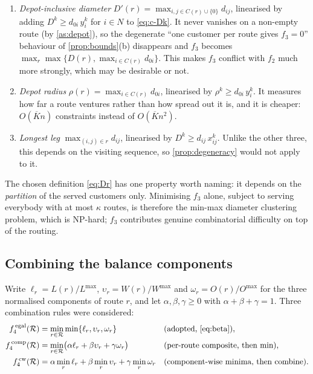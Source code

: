 \documentclass[11pt,a4paper]{article}
\theoremstyle{definition}
\theoremstyle{plain}
\newcommand{\Routes}{\mathcal{R}}
\newcommand{\Cust}{N}
\newcommand{\Lmax}{L^{\max}}
\newcommand{\Wmax}{W^{\max}}
\newcommand{\Omax}{O^{\max}}
\begin{document}
\begin{enumerate}[label=(\alph*),leftmargin=*]
\item \emph{Depot-inclusive diameter}
  $D'(r) = \max_{i,j \in C(r)\cup\{0\}} d_{ij}$, linearised by adding
  $D^k \ge d_{0i}\, y^k_i$ for $i \in \Cust$ to \eqref{eq:c-Dk}.  It never
  vanishes on a non-empty route (by \cref{as:depot}), so the degenerate
  ``one customer per route gives $f_3 = 0$'' behaviour of
  \cref{prop:bounds}(b) disappears and $f_3$ becomes
  $\max_r \max\{D(r), \max_{i\in C(r)} d_{0i}\}$.  This makes $f_3$ conflict
  with $f_2$ much more strongly, which may be desirable or not.
\item \emph{Depot radius} $\rho(r) = \max_{i \in C(r)} d_{0i}$, linearised by
  $\rho^k \ge d_{0i}\,y^k_i$.  It measures how far a route ventures rather than
  how spread out it is, and it is cheaper: $O(\overline{K} n)$ constraints
  instead of $O(\overline{K} n^2)$.
\item \emph{Longest leg} $\max_{(i,j) \in r} d_{ij}$, linearised by
  $D^k \ge d_{ij}\, x^k_{ij}$.  Unlike the other three, this depends on the
  visiting sequence, so \cref{prop:degeneracy} would not apply to it.
\end{enumerate}

The chosen definition \eqref{eq:Dr} has one property worth naming: it depends
on the \emph{partition} of the served customers only.  Minimising $f_3$ alone,
subject to serving everybody with at most $\kappa$ routes, is therefore the
min-max diameter clustering problem, which is NP-hard; $f_3$ contributes
genuine combinatorial difficulty on top of the routing.

\subsection{Combining the balance components}
\label{sec:alt-balance}

Write $\ell_r = L(r)/\Lmax$, $\upsilon_r = W(r)/\Wmax$ and
$\omega_r = O(r)/\Omax$ for the three normalised components of route $r$, and
let $\alpha,\beta,\gamma \ge 0$ with $\alpha+\beta+\gamma = 1$.  Three
combination rules were considered:
\begin{align}
  f_4^{\,\mathrm{egal}}(\Routes)
    &= \min_{r \in \Routes} \min\{\ell_r, \upsilon_r, \omega_r\}
    && \text{(adopted, \eqref{eq:beta})},
  \label{eq:bal-egal}\\
  f_4^{\,\mathrm{comp}}(\Routes)
    &= \min_{r \in \Routes}
       \bigl( \alpha \ell_r + \beta \upsilon_r + \gamma \omega_r \bigr)
    && \text{(per-route composite, then min)},
  \label{eq:bal-comp}\\
  f_4^{\,\mathrm{cw}}(\Routes)
    &= \alpha \min_{r} \ell_r + \beta \min_{r} \upsilon_r
       + \gamma \min_{r} \omega_r
    && \text{(component-wise minima, then combine)}.
  \label{eq:bal-cw}
\end{align}
\end{document}
